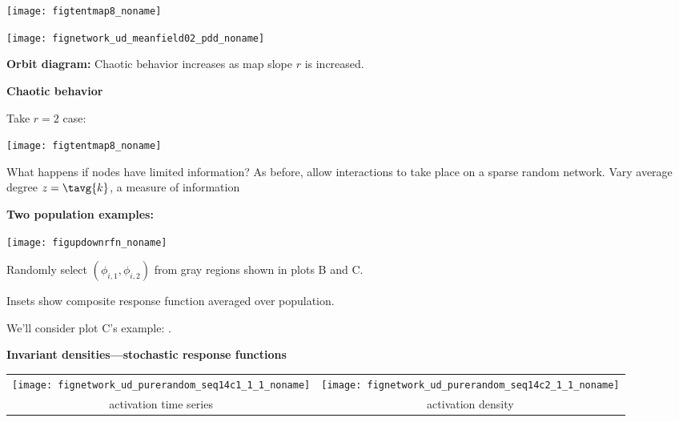     \texttt{[image: figtentmap8\_noname]} 
  
      
    
          
      \texttt{[image: fignetwork\_ud\_meanfield02\_pdd\_noname]}  
      
      \textbf{Orbit diagram:}
        Chaotic behavior increases
        as map slope $r$ is increased.
      
      

  \textbf{Chaotic behavior}

  Take $r=2$ case:
  \begin{center}
    \texttt{[image: figtentmap8\_noname]} 
  \end{center}

  
   What happens if nodes have limited information?
   As before, allow interactions to take place on a sparse random network.
   Vary average degree $z=\tavg{k}$, a measure of information
  


  \textbf{Two population examples:}

  \texttt{[image: figupdownrfn\_noname]} 
    
  
     
      Randomly select $(\phi_{i,1},\phi_{i,2})$ from
      gray regions shown in plots B and C.
    
      Insets show composite response function
      averaged over population.
    
      We'll consider plot C's example: .
  


  \textbf{Invariant densities---stochastic response functions}

  \centering
  \begin{tabular}{cc}
    \texttt{[image: fignetwork\_ud\_purerandom\_seq14c1\_1\_1\_noname]} &
    \texttt{[image: fignetwork\_ud\_purerandom\_seq14c2\_1\_1\_noname]} \\
    activation time series & activation density \\
  \end{tabular}


